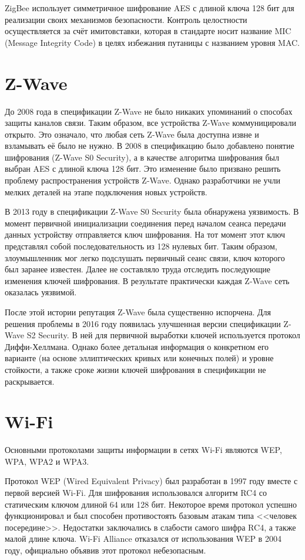 	ZigBee использует симметричное шифрование AES с длиной ключа 128 бит для реализации своих механизмов 
	безопасности. Контроль целостности осуществляется за счёт имитовставки, которая в стандарте носит название MIC
	(Message Integrity Code) в целях избежания путаницы с названием уровня MAC.

	
	\section{Z-Wave}
	До 2008 года в спецификации Z-Wave не было никаких упоминаний о способах защиты каналов связи. 
	Таким образом, все устройства Z-Wave коммуницировали открыто. Это означало, что любая сеть Z-Wave 
	была доступна извне и взламывать её было не нужно. В 2008 в спецификацию было добавлено понятие 
	шифрования (Z-Wave S0 Security), а в качестве алгоритма шифрования был выбран AES с длиной ключа 128 бит. 
	Это изменение было призвано решить проблему распространения устройств Z-Wave. Однако разработчики
	не учли мелких деталей на этапе подключения новых устройств.
	
	В 2013 году в спецификации  Z-Wave S0 Security была обнаружена уязвимость. В момент первичной 
	инициализации соединения перед началом сеанса передачи данных устройству отправляется ключ шифрования.
	На тот момент этот ключ представлял собой последовательность из 128 нулевых бит. Таким образом, злоумышленник
	мог легко подслушать первичный сеанс связи, ключ которого был заранее известен. Далее не
	составляло труда отследить последующие изменения ключей шифрования. В результате практически
	каждая Z-Wave сеть оказалась уязвимой.
	
	После этой истории репутация Z-Wave была существенно испорчена. Для решения проблемы в 2016 году
	появилась улучшенная версии спецификации Z-Wave S2 Security. В ней для первичной выработки ключей
	используется протокол Диффи-Хеллмана. Однако более детальная информация о конкретном его варианте
	(на основе эллиптических кривых или конечных полей) и уровне стойкости, а также сроке жизни ключей
	шифрования в спецификации не раскрывается.
	
	
	\section{Wi-Fi}
	Основными протоколами защиты информации в сетях Wi-Fi являются WEP, WPA, WPA2 и WPA3.
	
	Протокол WEP (Wired Equivalent Privacy) был разработан в 1997 году вместе с первой версией Wi-Fi.
	Для шифрования использовался алгоритм RC4 со статическим ключом длиной 64 или 128 бит. Некоторое время
	протокол успешно функционировал и был способен противостоять базовым атакам типа <<человек посередине>>.
	Недостатки заключались в слабости самого шифра RC4, а также малой длине ключа. Wi-Fi Alliance отказался 
	от использования WEP в 2004 году, официально объявив этот протокол небезопасным.
	
